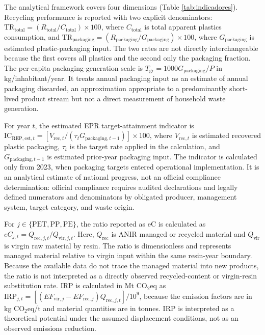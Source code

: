 \documentclass[review,10pt]{elsarticle}
\newcommand{\changepar}[1]{#1\par\medskip}
\begin{document}
\changepar{The analytical framework covers four dimensions (Table \ref{tab:indicadores}). Recycling performance is reported with two explicit denominators: $\mathrm{TR}_{\mathrm{total}}=(R_{\mathrm{total}}/C_{\mathrm{total}})\times100$, where $C_{\mathrm{total}}$ is total apparent plastics consumption, and $\mathrm{TR}_{\mathrm{packaging}}=(R_{\mathrm{packaging}}/G_{\mathrm{packaging}})\times100$, where $G_{\mathrm{packaging}}$ is estimated plastic-packaging input. The two rates are not directly interchangeable because the first covers all plastics and the second only the packaging fraction. The per-capita packaging-generation scale is $T_{\mathrm{gr}}=1000G_{\mathrm{packaging}}/P$ in kg/inhabitant/year. It treats annual packaging input as an estimate of annual packaging discarded, an approximation appropriate to a predominantly short-lived product stream but not a direct measurement of household waste generation.}

\changepar{For year $t$, the estimated EPR target-attainment indicator is $\mathrm{IC}_{\mathrm{REP,est},t}=[V_{\mathrm{rec},t}/(\tau_tG_{\mathrm{packaging},t-1})]\times100$, where $V_{\mathrm{rec},t}$ is estimated recovered plastic packaging, $\tau_t$ is the target rate applied in the calculation, and $G_{\mathrm{packaging},t-1}$ is estimated prior-year packaging input. The indicator is calculated only from 2023, when packaging targets entered operational implementation. It is an analytical estimate of national progress, not an official compliance determination: official compliance requires audited declarations and legally defined numerators and denominators by obligated producer, management system, target category, and waste origin.}

\changepar{For $j\in\{\mathrm{PET},\mathrm{PP},\mathrm{PE}\}$, the ratio reported as eC is calculated as $eC_{j,t}=Q_{\mathrm{rec},j,t}/Q_{\mathrm{vir},j,t}$. Here, $Q_{\mathrm{rec}}$ is ANIR managed or recycled material and $Q_{\mathrm{vir}}$ is virgin raw material by resin. The ratio is dimensionless and represents managed material relative to virgin input within the same resin-year boundary. Because the available data do not trace the managed material into new products, the ratio is not interpreted as a directly observed recycled-content or virgin-resin substitution rate. IRP is calculated in Mt CO$_2$eq as $\mathrm{IRP}_{j,t}=[(EF_{\mathrm{vir},j}-EF_{\mathrm{rec},j})Q_{\mathrm{rec},j,t}]/10^9$, because the emission factors are in kg CO$_2$eq/t and material quantities are in tonnes. IRP is interpreted as a theoretical potential under the assumed displacement conditions, not as an observed emissions reduction.}
\end{document}
